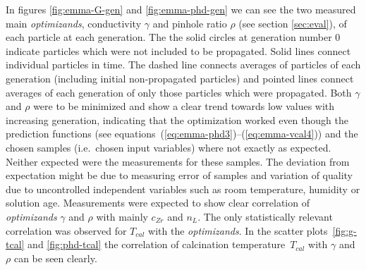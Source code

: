 In figures \ref{fig:emma-G-gen} and \ref{fig:emma-phd-gen} we can see the two measured main \textit{optimizands}, 
conductivity $\gamma$ and pinhole ratio $\rho$ (see section \ref{sec:eval}), of each particle at each generation.
The the solid circles at generation number 0 indicate particles which were not included to be propagated. 
Solid lines connect individual particles in time. 
The dashed line connects averages of particles of each generation (including initial non-propagated particles) and 
pointed lines connect averages of each generation of only those particles which were propagated. 
%
Both $\gamma$ and $\rho$ were to be minimized and show a clear trend towards low values with increasing generation, 
indicating that the optimization worked even though 
the prediction functions (see equations~(\ref{eq:emma-phd3})--(\ref{eq:emma-vcal4})) 
and the chosen samples (i.e.\ chosen input variables) where not exactly as expected. 
Neither expected were the measurements for these samples.
The deviation from expectation might be due to measuring error of samples and variation of quality due to uncontrolled independent variables such as room temperature, humidity or solution age. 
Measurements were expected to show clear correlation of \textit{optimizands} $\gamma$ and $\rho$ with mainly $c_{Zr}$ and $n_L$.
The only statistically relevant correlation was observed for $T_{cal}$ with the \textit{optimizands}.
%
In the scatter plots~\ref{fig:g-tcal} and \ref{fig:phd-tcal} the correlation of calcination temperature~$T_{cal}$ with $\gamma$ and $\rho$ can be seen clearly. 

